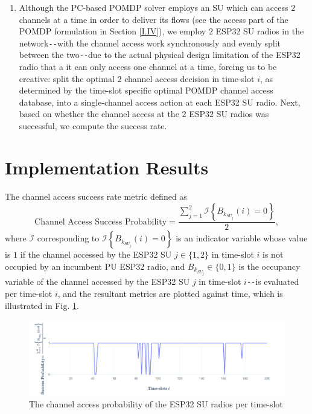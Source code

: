 \begin{enumerate}
    \item Although the PC-based POMDP solver employs an SU which can access $2$ channels at a time in order to deliver its flows (see the access part of the POMDP formulation in Section \ref{I.IV}), we employ $2$ ESP32 SU radios in the network\texttt{-{}-}with the channel access work synchronously and evenly split between the two\texttt{-{}-}due to the actual physical design limitation of the ESP32 radio that a it can only access one channel at a time, forcing us to be creative: split the optimal $2$ channel access decision in time-slot $i$, as determined by the time-slot specific optimal POMDP channel access database, into a single-channel access action at each ESP32 SU radio. Next, based on whether the channel access at the $2$ ESP32 SU radios was successful, we compute the success rate.
\end{enumerate}
\section{Implementation Results}\label{D.II}
The channel access success rate metric defined as
\begin{equation}\label{C.I}
    \text{Channel Access Success Probability}=\frac{\sum_{j=1}^{2}\mathcal{I}\left\{B_{k_{SU_{j}}}(i)=0\right\}}{2},
\end{equation}
where $\mathcal{I}$ corresponding to $\mathcal{I}\left\{B_{k_{SU_{j}}}(i)=0\right\}$ is an indicator variable whose value is $1$ if the channel accessed by the ESP32 SU $j{\in}\{1,2\}$ in time-slot $i$ is not occupied by an incumbent PU ESP32 radio, and $B_{k_{SU_{j}}}{\in}\{0,1\}$ is the occupancy variable of the channel accessed by the ESP32 SU $j$ in time-slot $i$\texttt{-{}-}is evaluated per time-slot $i$, and the resultant metrics are plotted against time, which is illustrated in Fig. \ref{fig:C.1}.
\begin{figure} [htb]
    \centerline{
    \includegraphics[width = 1.0\textwidth]{ESP32_Success_Probability.PNG}}
    \caption{The channel access probability of the ESP32 SU radios per time-slot}
    \label{fig:C.1}
\end{figure}
